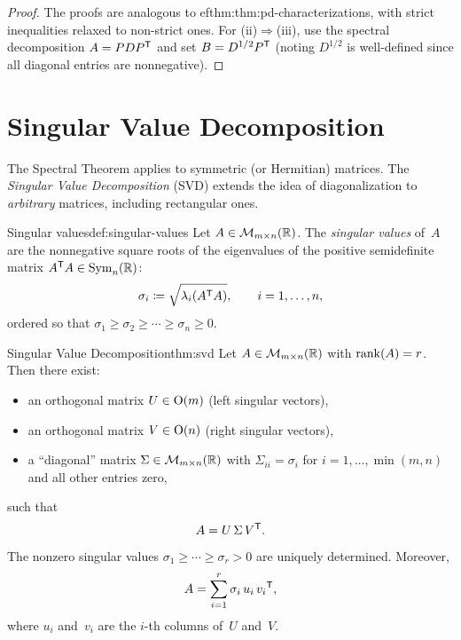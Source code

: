 \begin{proof}
The proofs are analogous to 
ef{thm:thm:pd-characterizations}, with
strict inequalities relaxed to non-strict ones.  For (ii)$\Rightarrow$(iii),
use the spectral decomposition $A = PD{P}^{\mathsf{T}}$ and set
$B = D^{1/2}{P}^{\mathsf{T}}$ (noting $D^{1/2}$ is well-defined since all
diagonal entries are nonnegative).
\end{proof}


\section{Singular Value Decomposition}\label{sec:svd}

The Spectral Theorem applies to symmetric (or Hermitian) matrices.  The
\emph{Singular Value Decomposition} (SVD)
extends the idea of diagonalization to \emph{arbitrary} matrices,
including rectangular ones.

\begin{definition}{Singular values}{def:singular-values}
Let $A\in\mathcal{M}_{m\times n}({\mathbb{R}})$.  The \emph{singular values} of~$A$
are the nonnegative square roots of the eigenvalues of the positive
semidefinite matrix ${A}^{\mathsf{T}}A\in\operatorname{Sym}_n({\mathbb{R}})$:
\[
  \sigma_i \coloneqq \sqrt{\lambda_i({A}^{\mathsf{T}}A)},
  \qquad i = 1,\ldots,n,
\]
ordered so that $\sigma_1\geq\sigma_2\geq\cdots\geq\sigma_n\geq 0$.
\end{definition}

\begin{theorem}{Singular Value Decomposition}{thm:svd}
Let $A\in\mathcal{M}_{m\times n}({\mathbb{R}})$ with $\operatorname{rank}(A)=r$.  Then there exist:
\begin{itemize}
  \item an orthogonal matrix $U\in\operatorname{O}(m)$ (left singular vectors),
  \item an orthogonal matrix $V\in\operatorname{O}(n)$ (right singular vectors),
  \item a ``diagonal'' matrix $\Sigma\in\mathcal{M}_{m\times n}({\mathbb{R}})$ with
    $\Sigma_{ii}=\sigma_i$ for $i=1,\ldots,\min(m,n)$ and all other
    entries zero,
\end{itemize}
such that
\[
  A = U\,\Sigma\,{V}^{\mathsf{T}}.
\]
The nonzero singular values $\sigma_1\geq\cdots\geq\sigma_r>0$ are
uniquely determined.  Moreover,
\[
  A = \sum_{i=1}^{r} \sigma_i\, u_i\,{v_i}^{\mathsf{T}},
\]
where $u_i$ and~$v_i$ are the $i$-th columns of~$U$ and~$V$.
\end{theorem}

